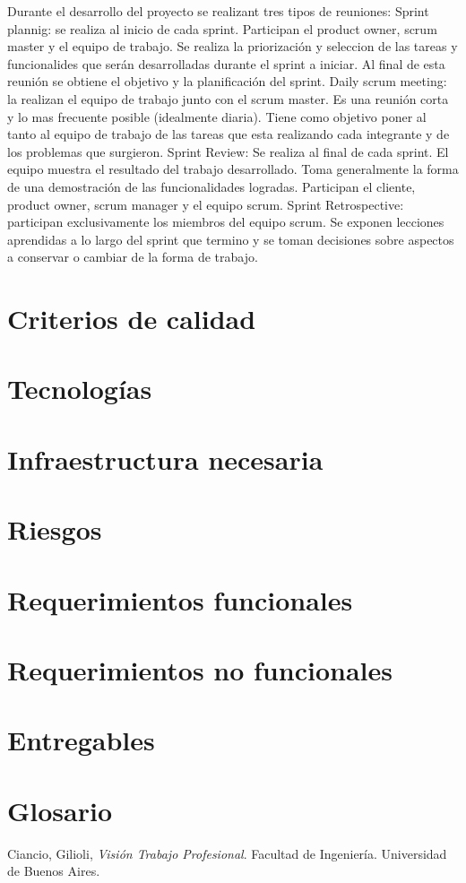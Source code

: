 \documentclass[12pt,a4paper]{article}
\begin{document}
Durante el desarrollo del proyecto se realizant tres tipos de reuniones:
Sprint plannig: se realiza al inicio de cada sprint. Participan el product owner, scrum master y el equipo de trabajo. Se realiza la priorización y seleccion de las tareas y funcionalides que serán desarrolladas durante el sprint a iniciar. Al final de esta reunión se obtiene el objetivo y la planificación del sprint.
Daily scrum meeting: la realizan el equipo de trabajo junto con el scrum master. Es una reunión corta y lo mas frecuente posible (idealmente diaria).  Tiene como objetivo poner al tanto al equipo de trabajo de las tareas que esta realizando cada integrante y de los problemas que surgieron.
Sprint Review: Se realiza al final de cada sprint. El equipo muestra el resultado del trabajo desarrollado. Toma generalmente la forma de una demostración de las funcionalidades logradas. Participan el cliente, product owner, scrum manager y el equipo scrum.
Sprint Retrospective: participan exclusivamente los miembros del equipo scrum. Se exponen lecciones aprendidas a lo largo del sprint que termino y se toman decisiones sobre aspectos a conservar o cambiar de la forma de trabajo.
	\section{Criterios de calidad}
	\section{Tecnologías}
	\section{Infraestructura necesaria}
	\section{Riesgos}
	\section{Requerimientos funcionales}
	\section{Requerimientos no funcionales}
	\section{Entregables}
	\section{Glosario}

\newpage
\begin{thebibliography}{9}
	Ciancio, Gilioli,
	\emph{Visión Trabajo Profesional}.
	Facultad de Ingeniería.
	Universidad de Buenos Aires. 
\end{thebibliography}
\end{document}
